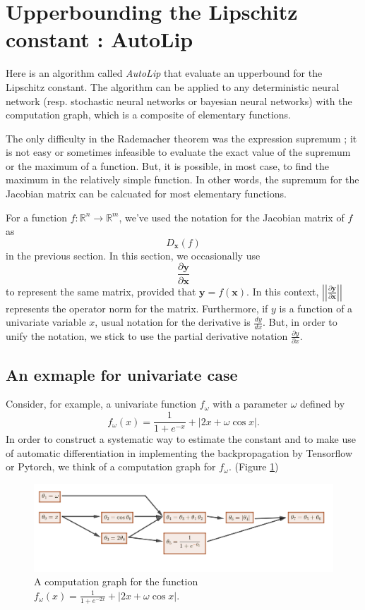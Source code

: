 \documentclass[11pt]{report}
\begin{document}
\section{Upperbounding the Lipschitz constant : AutoLip}

Here is an algorithm called \emph{AutoLip} that evaluate an upperbound for the Lipschitz constant.
The algorithm can be applied to any deterministic neural network (resp. stochastic neural networks or bayesian neural networks) with the computation graph, which is a composite of elementary functions.

The only difficulty in the Rademacher theorem was the expression supremum ; it is not easy or sometimes infeasible to evaluate the exact value of the supremum or the maximum of a function.
But, it is possible, in most case, to find the maximum in the relatively simple function.
In other words, the supremum for the Jacobian matrix can be calcuated for most elementary functions.

For a function \(f:\mathbb R^n\to\mathbb R^m\), we've used the notation for the Jacobian matrix of \(f\) as
\[D_{\boldsymbol x}(f)\]
in the previous section.
In this section, we occasionally use
\[\frac{\partial\boldsymbol y}{\partial\boldsymbol x}\]
to represent the same matrix, provided that \(\boldsymbol y=f(\boldsymbol x)\).
In this context, \(\left|\left|\frac{\partial\boldsymbol y}{\partial\boldsymbol x}\right|\right|\) represents the operator norm for the matrix.
Furthermore, if \(y\) is a function of a univariate variable \(x\), usual notation for the derivative is \(\frac{dy}{dx}\).
But, in order to unify the notation, we stick to use the partial derivative notation \(\frac{\partial y}{\partial x}\).


\subsection{An exmaple for  univariate case}
Consider, for example, a univariate function \(f_\omega\) with a parameter \(\omega\) defined by
\[f_\omega(x) = \frac1{1+e^{-x}}+\left|2x+\omega\cos x\right|.\]
In order to construct a systematic way to estimate the constant and to make use of automatic differentiation in implementing the backpropagation by Tensorflow or Pytorch, we think of a computation graph for \(f_\omega\). (Figure \ref{computation_graph_1})

\begin{figure}[h]
\centering
\includegraphics[width=\textwidth]{computation_graph_1}
\caption{A computation graph for the function \(f_\omega(x)=\frac1{1+e^{-2x}}+\left|2x+\omega\cos x\right|.\)}
\label{computation_graph_1}
\end{figure}
\end{document}
